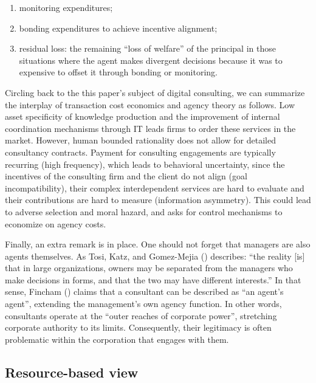 \documentclass[
  man,floatsintext]{apa6}
\providecommand{\tightlist}{%
  \setlength{\itemsep}{0pt}\setlength{\parskip}{0pt}}
\begin{document}
\begin{enumerate}
\def\labelenumi{\arabic{enumi}.}
\tightlist
\item
  monitoring expenditures;
\item
  bonding expenditures to achieve incentive alignment;
\item
  residual loss: the remaining ``loss of welfare'' of the principal in those situations where the agent makes divergent decisions because it was to expensive to offset it through bonding or monitoring.
\end{enumerate}

Circling back to the this paper's subject of digital consulting, we can summarize the interplay of transaction cost economics and agency theory as follows. Low asset specificity of knowledge production and the improvement of internal coordination mechanisms through IT leads firms to order these services in the market. However, human bounded rationality does not allow for detailed consultancy contracts. Payment for consulting engagements are typically recurring (high frequency), which leads to behavioral uncertainty, since the incentives of the consulting firm and the client do not align (goal incompatibility), their complex interdependent services are hard to evaluate and their contributions are hard to measure (information asymmetry). This could lead to adverse selection and moral hazard, and asks for control mechanisms to economize on agency costs.

Finally, an extra remark is in place. One should not forget that managers are also agents themselves. As Tosi, Katz, and Gomez-Mejia () describes: ``the reality {[}is{]} that in large organizations, owners may be separated from the managers who make decisions in forms, and that the two may have different interests.'' In that sense, Fincham () claims that a consultant can be described as ``an agent's agent'', extending the management's own agency function. In other words, consultants operate at the ``outer reaches of corporate power'', stretching corporate authority to its limits. Consequently, their legitimacy is often problematic within the corporation that engages with them.

\subsection{Resource-based view}\label{resource-based-view}
\end{document}
